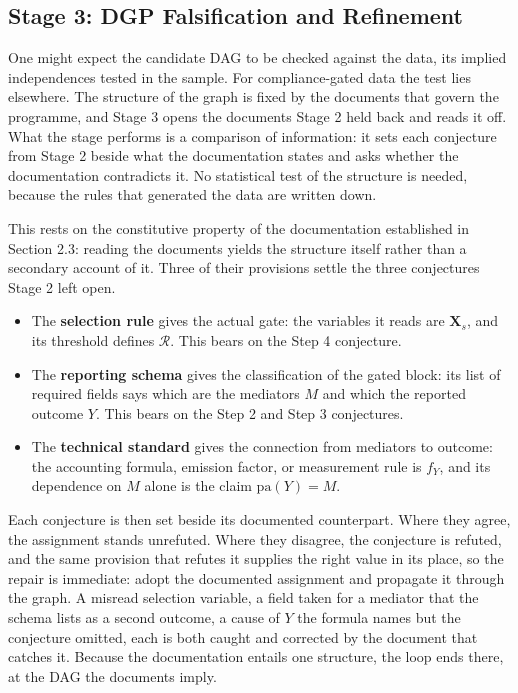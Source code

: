 \subsection{Stage 3: DGP Falsification and Refinement}

One might expect the candidate DAG to be checked against the data, its implied independences tested in the sample. For compliance-gated data the test lies elsewhere. The structure of the graph is fixed by the documents that govern the programme, and Stage 3 opens the documents Stage 2 held back and reads it off. What the stage performs is a comparison of information: it sets each conjecture from Stage 2 beside what the documentation states and asks whether the documentation contradicts it. No statistical test of the structure is needed, because the rules that generated the data are written down.

This rests on the constitutive property of the documentation established in Section 2.3: reading the documents yields the structure itself rather than a secondary account of it. Three of their provisions settle the three conjectures Stage 2 left open.

\begin{itemize}
  \item The \textbf{selection rule} gives the actual gate: the variables it reads are $\mathbf{X}_s$, and its threshold defines $\mathcal{R}$. This bears on the Step 4 conjecture.
  \item The \textbf{reporting schema} gives the classification of the gated block: its list of required fields says which are the mediators $M$ and which the reported outcome $Y$. This bears on the Step 2 and Step 3 conjectures.
  \item The \textbf{technical standard} gives the connection from mediators to outcome: the accounting formula, emission factor, or measurement rule is $f_Y$, and its dependence on $M$ alone is the claim $\mathrm{pa}(Y) = M$.
\end{itemize}

Each conjecture is then set beside its documented counterpart. Where they agree, the assignment stands unrefuted. Where they disagree, the conjecture is refuted, and the same provision that refutes it supplies the right value in its place, so the repair is immediate: adopt the documented assignment and propagate it through the graph. A misread selection variable, a field taken for a mediator that the schema lists as a second outcome, a cause of $Y$ the formula names but the conjecture omitted, each is both caught and corrected by the document that catches it. Because the documentation entails one structure, the loop ends there, at the DAG the documents imply.

